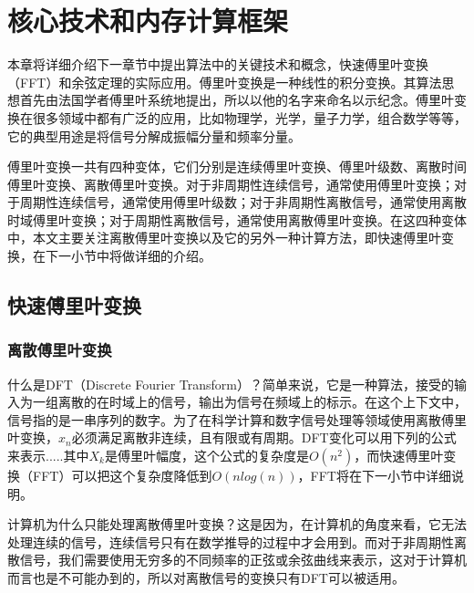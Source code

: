 
\chapter{核心技术和内存计算框架}
\label{chap:FFTandCos}

本章将详细介绍下一章节中提出算法中的关键技术和概念，快速傅里叶变换（FFT）和余弦定理的实际应用。傅里叶变换是一种线性的积分变换。其算法思想首先由法国学者傅里叶系统地提出，所以以他的名字来命名以示纪念。傅里叶变换在很多领域中都有广泛的应用，比如物理学，光学，量子力学，组合数学等等，它的典型用途是将信号分解成振幅分量和频率分量。

傅里叶变换一共有四种变体，它们分别是连续傅里叶变换、傅里叶级数、离散时间傅里叶变换、离散傅里叶变换。对于非周期性连续信号，通常使用傅里叶变换；对于周期性连续信号，通常使用傅里叶级数；对于非周期性离散信号，通常使用离散时域傅里叶变换；对于周期性离散信号，通常使用离散傅里叶变换。在这四种变体中，本文主要关注离散傅里叶变换以及它的另外一种计算方法，即快速傅里叶变换，在下一小节中将做详细的介绍。

\section{快速傅里叶变换}
\label{sec:FT}

\subsection{离散傅里叶变换}
\label{sec:DFT}
什么是DFT（Discrete Fourier Transform）？简单来说，它是一种算法，接受的输入为一组离散的在时域上的信号，输出为信号在频域上的标示。在这个上下文中，信号指的是一串序列的数字。为了在科学计算和数字信号处理等领域使用离散傅里叶变换，$x_n$必须满足离散非连续，且有限或有周期。DFT变化可以用下列的公式来表示.....其中$X_k$是傅里叶幅度，这个公式的复杂度是$O(n^2)$，而快速傅里叶变换（FFT）可以把这个复杂度降低到$O(nlog(n))$，FFT将在下一小节中详细说明。

计算机为什么只能处理离散傅里叶变换？这是因为，在计算机的角度来看，它无法处理连续的信号，连续信号只有在数学推导的过程中才会用到。而对于非周期性离散信号，我们需要使用无穷多的不同频率的正弦或余弦曲线来表示，这对于计算机而言也是不可能办到的，所以对离散信号的变换只有DFT可以被适用。

